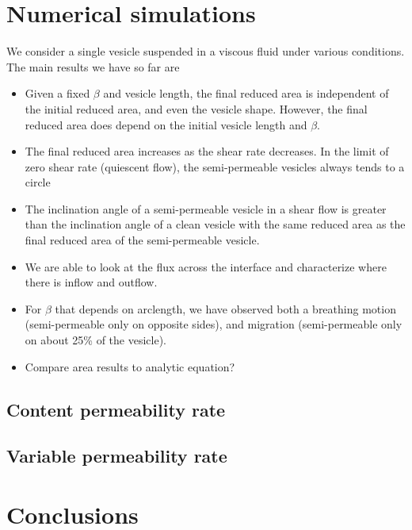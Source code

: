 \documentclass[twoside,twocolumn,9pt]{article}
\begin{document}
\section{Numerical simulations}
We consider a single vesicle suspended in a viscous fluid under various
conditions.  The main results we have so far are
\begin{itemize}
  \item Given a fixed $\beta$ and vesicle length, the final reduced area
    is independent of the initial reduced area, and even the vesicle
    shape. However, the final reduced area does depend on the initial
    vesicle length and $\beta$.
    
  \item The final reduced area increases as the shear rate decreases. In
    the limit of zero shear rate (quiescent flow), the semi-permeable
    vesicles always tends to a circle

  \item The inclination angle of a semi-permeable vesicle in a shear
    flow is greater than the inclination angle of a clean vesicle with
    the same reduced area as the final reduced area of the
    semi-permeable vesicle.

  \item We are able to look at the flux across the interface and
    characterize where there is inflow and outflow.

  \item For $\beta$ that depends on arclength, we have observed both a
    breathing motion (semi-permeable only on opposite sides), and
    migration (semi-permeable only on about 25\% of the vesicle).
    
  \item Compare area results to analytic equation?
\end{itemize}

\subsection{Content permeability rate}


\subsection{Variable permeability rate}

\section{Conclusions}
\end{document}
